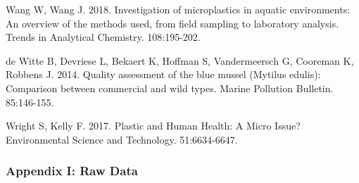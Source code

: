 \documentclass[]{article}
\begin{document}
Wang W, Wang J. 2018. Investigation of microplastics in aquatic
environments: An overview of the methods used, from field sampling to
laboratory analysis. Trends in Analytical Chemistry. 108:195-202.~

de Witte B, Devriese L, Bekaert K, Hoffman S, Vandermeersch G, Cooreman
K, Robbens J. 2014. Quality assessment of the blue mussel (Mytilus
edulis): Comparison between commercial and wild types. Marine Pollution
Bulletin. 85:146-155. ~

Wright S, Kelly F. 2017. Plastic and Human Health: A Micro Issue?
Environmental Science and Technology. 51:6634-6647.~

\hypertarget{appendix-i-raw-data}{%
\subsubsection{Appendix I: Raw Data}\label{appendix-i-raw-data}}
\end{document}
